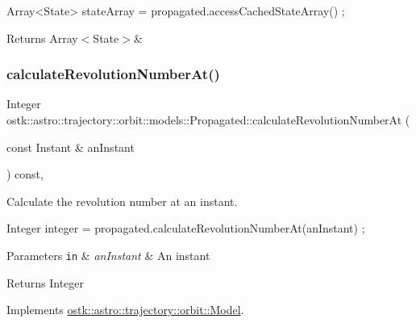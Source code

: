 \begin{DoxyCode}
Array<State> stateArray = propagated.accessCachedStateArray() ;
\end{DoxyCode}
 \begin{DoxyReturn}{Returns}
Array$<$\+State$>$\& 
\end{DoxyReturn}
\mbox{\label{classostk_1_1astro_1_1trajectory_1_1orbit_1_1models_1_1_propagated_a6360392c65494aa42aadff58ec58e49c}} 
\subsubsection{\texorpdfstring{calculate\+Revolution\+Number\+At()}{calculateRevolutionNumberAt()}}
{\footnotesize\ttfamily Integer ostk\+::astro\+::trajectory\+::orbit\+::models\+::\+Propagated\+::calculate\+Revolution\+Number\+At (\begin{DoxyParamCaption}\item[{const Instant \&}]{an\+Instant }\end{DoxyParamCaption}) const\hspace{0.3cm}{\ttfamily [override]}, {\ttfamily [virtual]}}



Calculate the revolution number at an instant. 


\begin{DoxyCode}
Integer integer = propagated.calculateRevolutionNumberAt(anInstant) ;
\end{DoxyCode}
 
\begin{DoxyParams}[1]{Parameters}
\mbox{\tt in}  & {\em an\+Instant} & An instant \\
\hline
\end{DoxyParams}
\begin{DoxyReturn}{Returns}
Integer 
\end{DoxyReturn}


Implements \hyperlink{classostk_1_1astro_1_1trajectory_1_1orbit_1_1_model_aeecf4cc22fa9c766801936c468cc52ac}{ostk\+::astro\+::trajectory\+::orbit\+::\+Model}.

